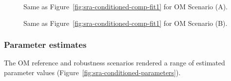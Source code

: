 \documentclass[11pt]{book}
\begin{document}
\begin{figure}[htb]

{\centering {} 

}

\caption{Same as Figure~\ref{fig:sra-conditioned-comp-fit1} for OM Scenario (A).}\label{fig:sra-conditioned-comp-fitA}
\end{figure}
\clearpage


\begin{figure}[htb]

{\centering {} 

}

\caption{Same as Figure~\ref{fig:sra-conditioned-comp-fit1} for OM Scenario (B).}\label{fig:sra-conditioned-comp-fitB}
\end{figure}
\hypertarget{sec:approach3-conditioning-parameters}{%
\subsubsection{Parameter estimates}\label{sec:approach3-conditioning-parameters}}

The OM reference and robustness scenarios rendered a range of estimated parameter values (Figure~\ref{fig:sra-conditioned-parameters}).
\end{document}
